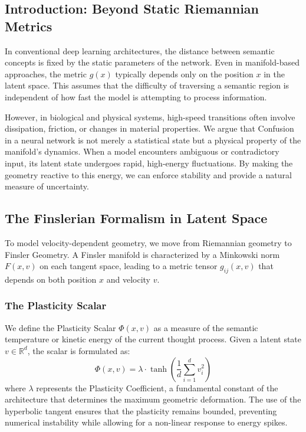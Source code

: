 \documentclass{article}
\numberwithin{equation}{section}
\begin{document}
\subsection{Introduction: Beyond Static Riemannian Metrics}
In conventional deep learning architectures, the distance between semantic concepts is fixed by the static parameters of the network. Even in manifold-based approaches, the metric $g(x)$ typically depends only on the position $x$ in the latent space. This assumes that the difficulty of traversing a semantic region is independent of how fast the model is attempting to process information.

However, in biological and physical systems, high-speed transitions often involve dissipation, friction, or changes in material properties. We argue that Confusion in a neural network is not merely a statistical state but a physical property of the manifold's dynamics. When a model encounters ambiguous or contradictory input, its latent state undergoes rapid, high-energy fluctuations. By making the geometry reactive to this energy, we can enforce stability and provide a natural measure of uncertainty.

\subsection{The Finslerian Formalism in Latent Space}
To model velocity-dependent geometry, we move from Riemannian geometry to Finsler Geometry. A Finsler manifold is characterized by a Minkowski norm $F(x, v)$ on each tangent space, leading to a metric tensor $g_{ij}(x, v)$ that depends on both position $x$ and velocity $v$.

\subsubsection{The Plasticity Scalar}
We define the Plasticity Scalar $\Phi(x, v)$ as a measure of the semantic temperature or kinetic energy of the current thought process. Given a latent state $v \in \mathbb{R}^d$, the scalar is formulated as:
\[
\Phi(x, v) = \lambda \cdot \tanh\left( \frac{1}{d} \sum_{i=1}^d v_i^2 \right)
\]
where $\lambda$ represents the Plasticity Coefficient, a fundamental constant of the architecture that determines the maximum geometric deformation. The use of the hyperbolic tangent ensures that the plasticity remains bounded, preventing numerical instability while allowing for a non-linear response to energy spikes.
\end{document}
